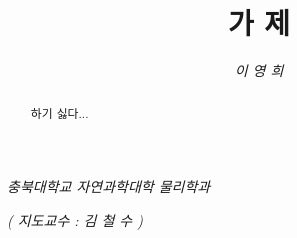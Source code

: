 \title{\textbf{\LARGE 가 제}}
\date{}
\vspace{1.5cm}
\author{\textit{\large {이 영 희}}}
\vspace{0.5cm}

\maketitle

\begin{center}
    \textit{충북대학교 자연과학대학 물리학과}
    \vspace{0.5cm}
    
    \textit{( 지도교수 : 김 철 수 )}
    \vspace{1cm}
\end{center}
    

\begin{abstract}
하기 싫다...
\end{abstract}

